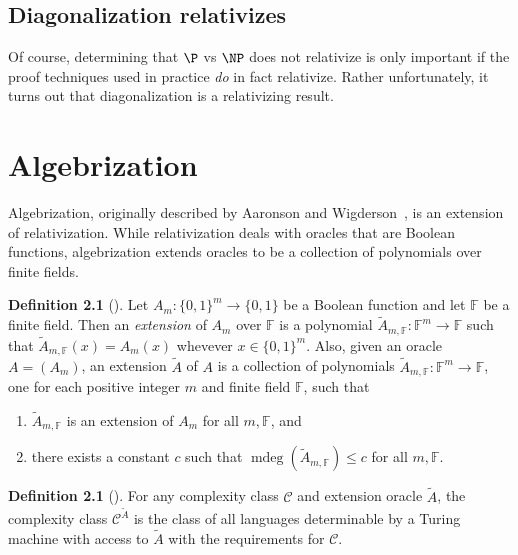 \documentclass{reedthesis}
\theoremstyle{plain}
\theoremstyle{definition}
\newtheorem{defn}[thm]{Definition}
\theoremstyle{remark}
\DeclareMathOperator{\mdeg}{mdeg}
\numberwithin{equation}{section}
\begin{document}
\section{Diagonalization relativizes}

Of course, determining that $\P$ vs $\NP$ does not relativize is only important
if the proof techniques used in practice \emph{do} in fact relativize. Rather
unfortunately, it turns out that diagonalization is a relativizing result.


\chapter{Algebrization}\label{chap:algebrization}

Algebrization, originally described by Aaronson and Wigderson~\cite{AW09}, is an
extension of relativization. While relativization deals with oracles that are
Boolean functions, algebrization extends oracles to be a collection of
polynomials over finite fields.

\begin{defn}[{\cite[Def.\ 2.2]{AW09}}]\label{def:ext-oracle}
  Let $A_{m}: \{0, 1\}^{m} \rightarrow \{0, 1\}$ be a Boolean function and let
  $\mathbb{F}$ be a finite field. Then an \emph{extension} of $A_{m}$
  over $\mathbb{F}$ is a polynomial
  $\tilde{A}_{m,\mathbb{F}}: \mathbb{F}^{m} \rightarrow \mathbb{F}$ such that
  $\tilde{A}_{m,\mathbb{F}}(x) = A_{m}(x)$ whevever $x \in \{0, 1\}^{m}$. Also,
  given an oracle $A = (A_{m})$, an extension $\tilde{A}$ of $A$ is a
  collection of polynomials
  $\tilde{A}_{m,\mathbb{F}}: \mathbb{F}^{m} \rightarrow \mathbb{F}$, one for each positive
  integer $m$ and finite field $\mathbb{F}$, such that
  \begin{enumerate}
    \item $\tilde{A}_{m,\mathbb{F}}$ is an extension of $A_{m}$ for all
          $m,\mathbb{F}$, and
    \item there exists a constant $c$ such that
          $\mdeg(\tilde{A}_{m,\mathbb{F}}) \le c$ for all $m, \mathbb{F}$.
  \end{enumerate}
\end{defn}

\begin{defn}[{\cite[Def.\ 2.2]{AW09}}]\label{def:ext-oracle-class}
  For any complexity class $\mathcal{C}$ and extension oracle $\tilde{A}$, the complexity
  class $\mathcal{C}^{\tilde{A}}$ is the class of all languages determinable by a Turing
  machine with access to $\tilde{A}$ with the requirements for $\mathcal{C}$.
\end{defn}
\end{document}
